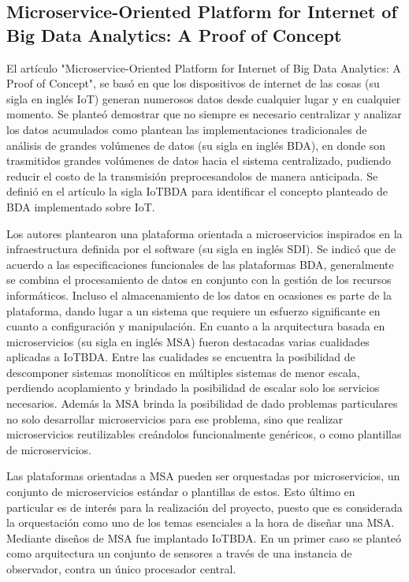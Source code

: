 \subsection{Microservice-Oriented Platform for Internet of Big Data Analytics: A Proof of Concept
}

El artículo "Microservice-Oriented Platform for Internet of Big Data Analytics: A Proof of Concept"\cite{li_microservice-oriented_2019}, se basó en que los dispositivos de internet de las cosas (su sigla en inglés IoT) generan numerosos datos desde cualquier lugar y en cualquier momento. Se planteó demostrar que no siempre es necesario centralizar y analizar los datos acumulados como plantean las implementaciones tradicionales de análisis de grandes volúmenes de datos (su sigla en inglés BDA), en donde son trasmitidos grandes volúmenes de datos hacia el sistema centralizado, pudiendo reducir el costo de la transmisión preprocesandolos de manera anticipada. Se definió en el artículo la sigla IoTBDA para identificar el concepto planteado de BDA implementado sobre IoT.\par

Los autores plantearon una plataforma orientada a microservicios inspirados en la infraestructura definida por el software (su sigla en inglés SDI).
Se indicó que de acuerdo a las especificaciones funcionales de las plataformas BDA, generalmente se combina el procesamiento de datos en conjunto con la gestión de los recursos informáticos. Incluso el almacenamiento de los datos en ocasiones es parte de la plataforma, dando lugar a un sistema que requiere un esfuerzo significante en cuanto a configuración y manipulación.
En cuanto a la arquitectura basada en microservicios (su sigla en inglés MSA) fueron destacadas varias cualidades aplicadas a IoTBDA. Entre las cualidades se encuentra la posibilidad de descomponer sistemas monolíticos en múltiples sistemas de menor escala, perdiendo acoplamiento y brindado la posibilidad de escalar solo los servicios necesarios. Además la MSA brinda la posibilidad de dado problemas particulares no solo desarrollar microservicios para ese problema, sino que realizar microservicios reutilizables creándolos funcionalmente genéricos, o como plantillas de microservicios.\par

Las plataformas orientadas a MSA pueden ser orquestadas por microservicios, un conjunto de microservicios estándar o plantillas de estos. Esto último en particular es de interés para la realización del proyecto, puesto que es considerada la orquestación como uno de los temas esenciales a la hora de diseñar una MSA. Mediante diseños de MSA fue implantado IoTBDA. En un primer caso se planteó como arquitectura un conjunto de sensores a través de una instancia de observador, contra un único procesador central.\par

